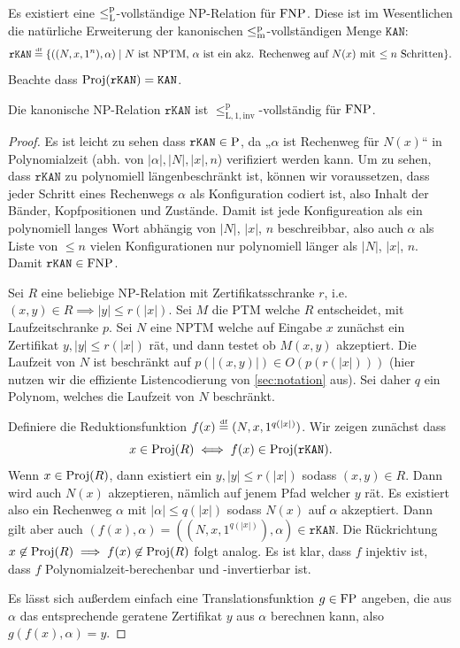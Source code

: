 Es existiert eine $\leqlp$-vollständige NP-Relation für $\FNP$. Diese ist im Wesentlichen die natürliche Erweiterung der kanonischen $\leqmp$-vollständigen Menge $\mathtt{KAN}$:
\[ \mathtt{rKAN} \defeq \{ ((N,x,1^n), \alpha) \mid \text{$N$ ist NPTM, $\alpha$ ist ein akz. Rechenweg auf $N(x)$ mit $\leq n$ Schritten} \}. \]
Beachte dass $\Proj(\mathtt{rKAN})=\mathtt{KAN}$.
\begin{theorem}
    Die kanonische NP-Relation $\mathtt{rKAN}$ 
    ist $\leq_\mathrm{L,1,inv}^\mathrm p$-vollständig für $\FNP$.
\end{theorem}
\begin{proof}
    Es ist leicht zu sehen dass $\mathtt{rKAN}\in\P$, da „$\alpha$ ist Rechenweg für $N(x)$“ in Polynomialzeit (abh. von $|\alpha|, |N|, |x|, n$) verifiziert werden kann. Um zu sehen, dass  $\mathtt{rKAN}$ zu polynomiell längenbeschränkt ist, können wir voraussetzen, dass jeder Schritt eines Rechenwegs $\alpha$ als Konfiguration codiert ist, also Inhalt der Bänder, Kopfpositionen und Zustände. Damit ist jede Konfigureation als ein polynomiell langes Wort abhängig von $|N|$, $|x|$, $n$ beschreibbar, also auch $\alpha$ als Liste von $\leq n$ vielen Konfigurationen nur polynomiell länger als $|N|$, $|x|$, $n$.
    Damit $\mathtt{rKAN}\in\FNP$.

    Sei $R$ eine beliebige NP-Relation mit Zertifikatsschranke $r$, i.e. $(x,y)\in R\implies |y|\leq r(|x|)$. Sei $M$ die PTM welche $R$ entscheidet, mit Laufzeitschranke $p$. Sei $N$ eine NPTM welche auf Eingabe $x$ zunächst ein Zertifikat $y, |y|\leq r(|x|)$ rät, und dann testet ob $M(x,y)$ akzeptiert. Die Laufzeit von $N$ ist beschränkt auf $p(|(x,y)|)\in O(p(r(|x|)))$ (hier nutzen wir die effiziente Listencodierung von \ref{sec:notation} aus). Sei daher $q$ ein Polynom, welches die Laufzeit von $N$ beschränkt.

    Definiere die Reduktionsfunktion $f(x)\defeq(N, x, 1^{q(|x|)})$. Wir zeigen zunächst dass
    \[ x\in \Proj(R)\iff f(x)\in \Proj(\mathtt{rKAN}). \]
    Wenn $x\in\Proj(R)$, dann existiert ein $y, |y|\leq r(|x|)$ sodass $(x,y)\in R$. Dann wird auch $N(x)$ akzeptieren, nämlich auf jenem Pfad welcher $y$ rät. Es existiert also ein Rechenweg $\alpha$ mit $|\alpha|\leq q(|x|)$ sodass $N(x)$ auf $\alpha$ akzeptiert. Dann gilt aber auch $(f(x), \alpha)=((N,x,1^{q(|x|)}),\alpha)\in \mathtt{rKAN}$.
    Die Rückrichtung $x\not\in \Proj(R)\implies f(x)\not\in\Proj(R)$ folgt analog.
    Es ist klar, dass $f$ injektiv ist, dass $f$ Polynomialzeit-berechenbar und -invertierbar ist. 

    Es lässt sich außerdem einfach eine Translationsfunktion $g\in \FP$ angeben, die  aus $\alpha$ das entsprechende geratene Zertifikat $y$ aus $\alpha$ berechnen kann, also $g(f(x), \alpha)=y$.
\end{proof}

